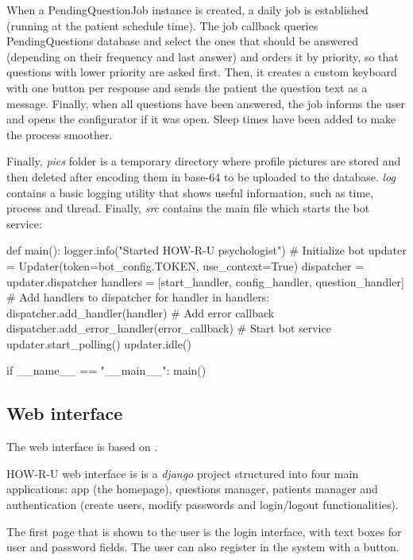 \documentclass[12pt,english]{article}
\begin{document}
When a PendingQuestionJob instance is created, a daily job is established (running at the patient schedule time). The job callback queries PendingQuestions database and select the ones that should be answered (depending on their frequency and last answer) and orders it by priority, so that questions with lower priority are asked first. Then, it creates a custom keyboard with one button per response and sends the patient the question text as a message. Finally, when all questions have been answered, the job informs the user and opens the configurator if it was open. Sleep times have been added to make the process smoother.


Finally, \emph{pics} folder is a temporary directory where profile pictures are stored and then deleted after encoding them in base-64 to be uploaded to the database. \emph{log} contains a basic logging utility that shows useful information, such as time, process and thread. Finally, \emph{src} contains the main file which starts the bot service:

\begin{python}[caption={Bot file, the one that starts the service}, captionpos=b]
def main():
    logger.info("Started HOW-R-U psychologist")
    # Initialize bot
    updater = Updater(token=bot_config.TOKEN, use_context=True)
    dispatcher = updater.dispatcher
    handlers = [start_handler, config_handler, question_handler]
    # Add handlers to dispatcher
    for handler in handlers:
        dispatcher.add_handler(handler)
    # Add error callback
    dispatcher.add_error_handler(error_callback)
    # Start bot service
    updater.start_polling()
    updater.idle()

if __name__ == "__main__":
    main()
\end{python}
\newpage
\subsection{Web interface}
\label{sec:web_int}


The web interface is based on \cite{appseed}.

HOW-R-U web interface is is a \emph{django} project structured into four main applications: app (the homepage), questions manager, patients manager and authentication (create users, modify passwords and login/logout functionalities).

The first page that is shown to the user is the login interface, with text boxes for user and password fields. The user can also register in the system with a button.
\end{document}
